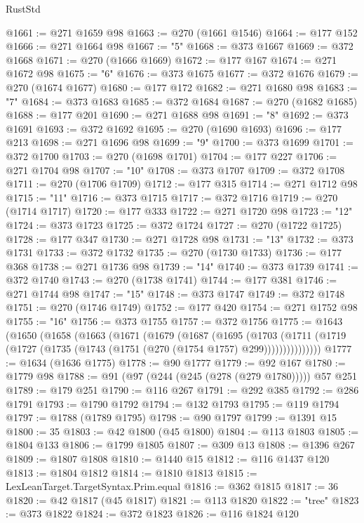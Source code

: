 \begin{lexlean}{RustStd}
\begin{coremodule}
@1661 := @271 @1659 @98
@1663 := @270 (@1661 @1546)
@1664 := @177 @152
@1666 := @271 @1664 @98
@1667 := "5"
@1668 := @373 @1667
@1669 := @372 @1668
@1671 := @270 (@1666 @1669)
@1672 := @177 @167
@1674 := @271 @1672 @98
@1675 := "6"
@1676 := @373 @1675
@1677 := @372 @1676
@1679 := @270 (@1674 @1677)
@1680 := @177 @172
@1682 := @271 @1680 @98
@1683 := "7"
@1684 := @373 @1683
@1685 := @372 @1684
@1687 := @270 (@1682 @1685)
@1688 := @177 @201
@1690 := @271 @1688 @98
@1691 := "8"
@1692 := @373 @1691
@1693 := @372 @1692
@1695 := @270 (@1690 @1693)
@1696 := @177 @213
@1698 := @271 @1696 @98
@1699 := "9"
@1700 := @373 @1699
@1701 := @372 @1700
@1703 := @270 (@1698 @1701)
@1704 := @177 @227
@1706 := @271 @1704 @98
@1707 := "10"
@1708 := @373 @1707
@1709 := @372 @1708
@1711 := @270 (@1706 @1709)
@1712 := @177 @315
@1714 := @271 @1712 @98
@1715 := "11"
@1716 := @373 @1715
@1717 := @372 @1716
@1719 := @270 (@1714 @1717)
@1720 := @177 @333
@1722 := @271 @1720 @98
@1723 := "12"
@1724 := @373 @1723
@1725 := @372 @1724
@1727 := @270 (@1722 @1725)
@1728 := @177 @347
@1730 := @271 @1728 @98
@1731 := "13"
@1732 := @373 @1731
@1733 := @372 @1732
@1735 := @270 (@1730 @1733)
@1736 := @177 @368
@1738 := @271 @1736 @98
@1739 := "14"
@1740 := @373 @1739
@1741 := @372 @1740
@1743 := @270 (@1738 @1741)
@1744 := @177 @381
@1746 := @271 @1744 @98
@1747 := "15"
@1748 := @373 @1747
@1749 := @372 @1748
@1751 := @270 (@1746 @1749)
@1752 := @177 @420
@1754 := @271 @1752 @98
@1755 := "16"
@1756 := @373 @1755
@1757 := @372 @1756
@1775 := @1643
    (@1650
      (@1658
        (@1663
          (@1671
            (@1679
              (@1687
                (@1695
                  (@1703
                    (@1711
                      (@1719 (@1727 (@1735 (@1743 (@1751 (@270 (@1754 @1757) @299)))))))))))))))
@1777 := @1634 (@1636 @1775)
@1778 := @90 @1777
@1779 := @92 @167
@1780 := @1779 @98
@1788 := @91 (@97 (@244 (@245 (@278 (@279 @1780))))) @57 @251
@1789 := @179 @251
@1790 := @116 @267
@1791 := @292 @385
@1792 := @286 @1791
@1793 := @1790 @1792
@1794 := @132 @1793
@1795 := @119 @1794
@1797 := @1788 (@1789 @1795)
@1798 := @90 @1797
@1799 := @1391 @15
@1800 := 35
@1803 := @42 @1800 (@45 @1800)
@1804 := @113 @1803
@1805 := @1804 @133
@1806 := @1799 @1805
@1807 := @309 @13
@1808 := @1396 @267
@1809 := @1807 @1808
@1810 := @1440 @15
@1812 := @116 @1437 @120
@1813 := @1804 @1812
@1814 := @1810 @1813
@1815 := LexLeanTarget.TargetSyntax.Prim.equal
@1816 := @362 @1815
@1817 := 36
@1820 := @42 @1817 (@45 @1817)
@1821 := @113 @1820
@1822 := "tree"
@1823 := @373 @1822
@1824 := @372 @1823
@1826 := @116 @1824 @120

\end{coremodule}
\end{lexlean}
